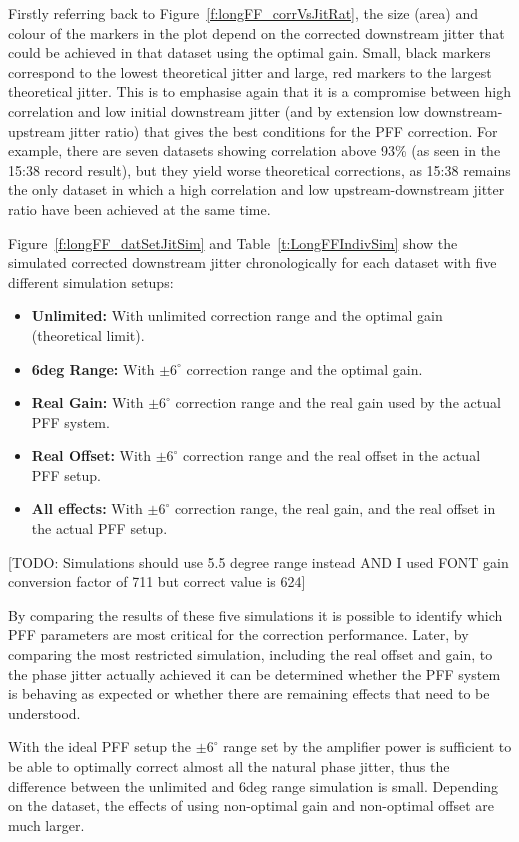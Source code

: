 Firstly referring back to Figure~\ref{f:longFF_corrVsJitRat}, the size (area) and colour of the markers in the plot depend on the corrected downstream jitter that could be achieved in that dataset using the optimal gain. Small, black markers correspond to the lowest theoretical jitter and large, red markers to the largest theoretical jitter. This is to emphasise again that it is a compromise between high correlation and low initial downstream jitter (and by extension low downstream-upstream jitter ratio) that gives the best conditions for the PFF correction. For example, there are seven datasets showing correlation above 93\% (as seen in the 15:38 record result), but they yield worse theoretical corrections, as 15:38 remains the only dataset in which a high correlation and low upstream-downstream jitter ratio have been achieved at the same time.

Figure~\ref{f:longFF_datSetJitSim} and Table~\ref{t:LongFFIndivSim} show the simulated corrected downstream jitter chronologically for each dataset with five different simulation setups:
\begin{itemize}
\item \textbf{Unlimited:} With unlimited correction range and the optimal gain (theoretical limit).
\item \textbf{6deg Range:} With \(\pm6^\circ\) correction range and the optimal gain.
\item \textbf{Real Gain:} With \(\pm6^\circ\) correction range and the real gain used by the actual PFF system.
\item \textbf{Real Offset:} With \(\pm6^\circ\) correction range and the real offset in the actual PFF setup.
\item \textbf{All effects:} With \(\pm6^\circ\) correction range, the real gain, and the real offset in the actual PFF setup.
\end{itemize}

[TODO: Simulations should use 5.5 degree range instead AND I used FONT gain conversion factor of 711 but correct value is 624]

By comparing the results of these five simulations it is possible to identify which PFF parameters are most critical for the correction performance. Later, by comparing the most restricted simulation, including the real offset and gain, to the phase jitter actually achieved it can be determined whether the PFF system is behaving as expected or whether there are remaining effects that need to be understood.

With the ideal PFF setup the \(\pm6^\circ\) range set by the amplifier power is sufficient to be able to optimally correct almost all the natural phase jitter, thus the difference between the unlimited and 6deg range simulation is small. Depending on the dataset, the effects of using non-optimal gain and non-optimal offset are much larger.

